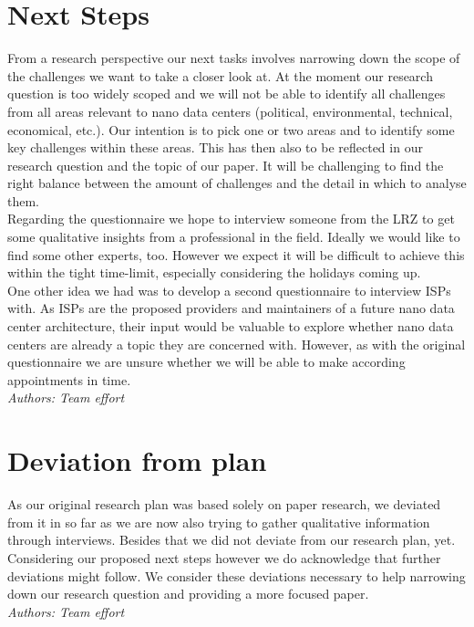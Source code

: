 \documentclass[sigchi-a, authorversion]{acmart}
\begin{document}
\section{Next Steps}
From a research perspective our next tasks involves narrowing down the scope of the challenges we want to take a closer look at. At the moment our research question is too widely scoped and we will not be able to identify all challenges from all areas relevant to nano data centers (political, environmental, technical, economical, etc.). Our intention is to pick one or two areas and to identify some key challenges within these areas. This has then also to be reflected in our research question and the topic of our paper. It will be challenging to find the right balance between the amount of challenges and the detail in which to analyse them.\\
Regarding the questionnaire we hope to interview someone from the LRZ to get some qualitative insights from a professional in the field. Ideally we would like to find some other experts, too. However we expect it will be difficult to achieve this within the tight time-limit, especially considering the holidays coming up.\\
One other idea we had was to develop a second questionnaire to interview ISPs with. As ISPs are the proposed providers and maintainers of a future nano data center architecture, their input would be valuable to explore whether nano data centers are already a topic they are concerned with. However, as with the original questionnaire we are unsure whether we will be able to make according appointments in time.\\
\textit{Authors: Team effort}\\

\section{Deviation from plan}
As our original research plan was based solely on paper research, we deviated from it in so far as we are now also trying to gather qualitative information through interviews. Besides that we did not deviate from our research plan, yet. Considering our proposed next steps however we do acknowledge that further deviations might follow. We consider these deviations necessary to help narrowing down our research question and providing a more focused paper.\\
\textit{Authors: Team effort}\\



\end{document}
